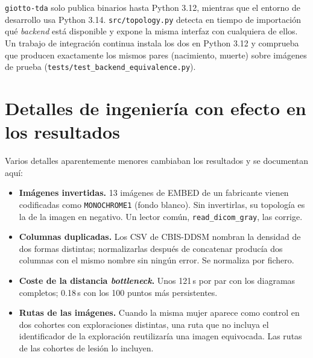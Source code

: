 \texttt{giotto-tda} solo publica binarios hasta Python 3.12, mientras que el
entorno de desarrollo usa Python 3.14. \texttt{src/topology.py} detecta en
tiempo de importación qué \textit{backend} está disponible y expone la misma
interfaz con cualquiera de ellos. Un trabajo de integración continua instala
los dos en Python 3.12 y comprueba que producen exactamente los mismos pares
(nacimiento, muerte) sobre imágenes de prueba
(\texttt{tests/test\_backend\_equivalence.py}).

\section{Detalles de ingeniería con efecto en los resultados}
Varios detalles aparentemente menores cambiaban los resultados y se
documentan aquí:
\begin{itemize}
  \item \textbf{Imágenes invertidas.} 13 imágenes de EMBED de un fabricante
        vienen codificadas como \texttt{MONOCHROME1} (fondo blanco). Sin
        invertirlas, su topología es la de la imagen en negativo. Un lector
        común, \texttt{read\_dicom\_gray}, las corrige.
  \item \textbf{Columnas duplicadas.} Los CSV de CBIS-DDSM nombran la
        densidad de dos formas distintas; normalizarlas después de
        concatenar producía dos columnas con el mismo nombre sin ningún
        error. Se normaliza por fichero.
  \item \textbf{Coste de la distancia \textit{bottleneck}.} Unos 121\,s por
        par con los diagramas completos; 0.18\,s con los 100 puntos más
        persistentes.
  \item \textbf{Rutas de las imágenes.} Cuando la misma mujer aparece como
        control en dos cohortes con exploraciones distintas, una ruta que no
        incluya el identificador de la exploración reutilizaría una imagen
        equivocada. Las rutas de las cohortes de lesión lo incluyen.
\end{itemize}

